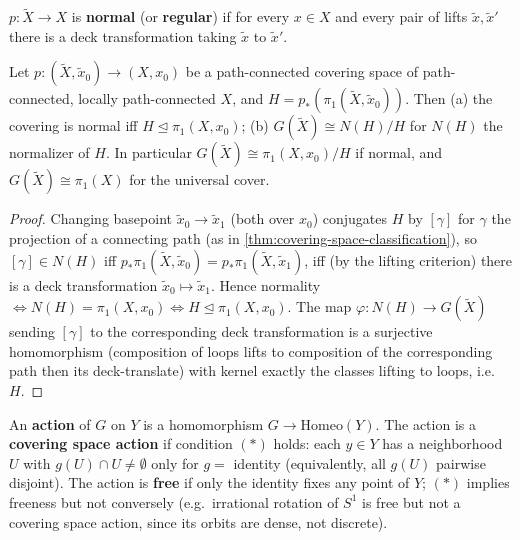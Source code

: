 \begin{definition}
\label{def:normal-covering-space}
$p:\tilde X\to X$ is \textbf{normal} (or \textbf{regular}) if for every $x\in X$ and every
pair of lifts $\tilde x,\tilde x'$ there is a deck transformation taking $\tilde x$ to $\tilde x'$.
\end{definition}

\begin{proposition}
\label{prop:normal-covering-deck-group}
Let $p:(\tilde X,\tilde x_0)\to(X,x_0)$ be a path-connected covering space of
path-connected, locally path-connected $X$, and $H = p_*(\pi_1(\tilde X,\tilde x_0))$. Then
(a) the covering is normal iff $H \trianglelefteq \pi_1(X,x_0)$; (b) $G(\tilde X) \cong N(H)/H$
for $N(H)$ the normalizer of $H$. In particular $G(\tilde X)\cong\pi_1(X,x_0)/H$ if
normal, and $G(\tilde X) \cong \pi_1(X)$ for the universal cover.
\end{proposition}

\begin{proof}
Changing basepoint $\tilde x_0\to\tilde x_1$ (both over $x_0$) conjugates $H$ by
$[\gamma]$ for $\gamma$ the projection of a connecting path (as in
\cref{thm:covering-space-classification}), so $[\gamma]\in N(H)$ iff
$p_*\pi_1(\tilde X,\tilde x_0) = p_*\pi_1(\tilde X,\tilde x_1)$, iff (by the lifting criterion) there is
a deck transformation $\tilde x_0\mapsto\tilde x_1$. Hence normality $\iff N(H)=\pi_1(X,x_0)
\iff H\trianglelefteq\pi_1(X,x_0)$. The map $\varphi:N(H)\to G(\tilde X)$ sending $[\gamma]$ to the
corresponding deck transformation is a surjective homomorphism (composition of
loops lifts to composition of the corresponding path then its deck-translate) with
kernel exactly the classes lifting to loops, i.e.\ $H$.
\end{proof}

\begin{definition}
\label{def:group-action}
An \textbf{action} of $G$ on $Y$ is a homomorphism $G \to \mathrm{Homeo}(Y)$. The
action is a \textbf{covering space action} if condition $(*)$ holds: each $y\in Y$ has a
neighborhood $U$ with $g(U)\cap U \ne \emptyset$ only for $g=$ identity (equivalently,
all $g(U)$ pairwise disjoint). The action is \textbf{free} if only the identity fixes any
point of $Y$; $(*)$ implies freeness but not conversely (e.g.\ irrational rotation of
$S^1$ is free but not a covering space action, since its orbits are dense, not
discrete).
\end{definition}


